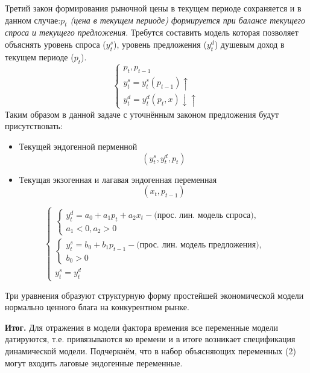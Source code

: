 \documentclass[12pt,a4paper]{article}
\begin{document}
Третий закон формирования рыночной цены в текущем периоде сохраняется и в данном случае:\textit{$p_t$ (цена в текущем периоде) формируется при балансе текущего спроса и текущего предложения}. Требутся составить модель которая позволяет объяснять уровень спроса ($y_t^s$), уровень предложения ($y_t^d$) душевым доход в текущем периоде ($p_t$).
\begin{equation*}
\begin{cases}
p_t, p_{t-1} \\
y_t^s = y_t^s(p_{t-1})\uparrow \\
y_t^d = y_t^d(p_t, x)\downarrow \uparrow
\end{cases}
\end{equation*}
Таким образом в данной задаче с уточнённым законом предложения будут присутствовать:
\begin{itemize}
\item Текущей эндогенной перменной 
\begin{equation}
(y_t^s, y_t^d, p_t)
\end{equation}
\item Текущая экзогенная и лагавая эндогенная переменная
\begin{equation}
(x_t, p_{t - 1})
\end{equation}
\end{itemize}
\begin{equation}
\begin{cases}
\begin{cases}
y_t^d = a_0 + a_1 p_t + a_2  x_t - \text{(прос. лин. модель спроса)}, \\
a_1 < 0, a_2 > 0
\end{cases} \\
\begin{cases}
y_t^s = b_0 + b_1 p_{t - 1} - \text{(прос. лин. модель предложения)}, \\
b_0 > 0
\end{cases} \\
y_t^s = y_t^d
\end{cases}
\end{equation}

Три уравнения образуют структурную форму простейшей экономической модели нормально ценного блага на конкурентном рынке.

\textbf{Итог.} Для отражения в модели фактора времения все переменные модели датируются, т.е. привязываются ко времени и в итоге возникает спецификация динамической модели. Подчеркнём, что в набор объясняющих переменных (2) могут входить лаговые эндогенные переменные.
\end{document}
